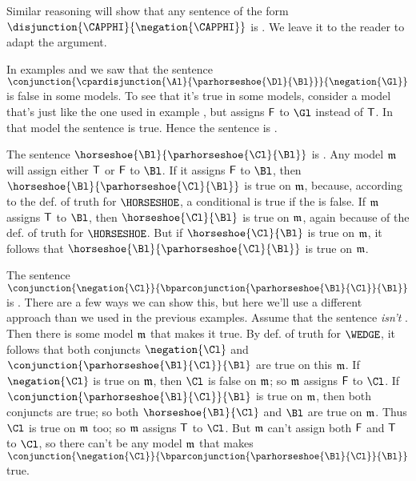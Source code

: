 \begin{majorILnc}{}
Similar reasoning will show that any sentence of the form $\disjunction{\CAPPHI}{\negation{\CAPPHI}}$ is .
We leave it to the reader to adapt the argument. 
\end{majorILnc}
\begin{majorILnc}{}
In examples  and  we saw that the sentence $\conjunction{\cpardisjunction{\Al}{\parhorseshoe{\Dl}{\Bl}}}{\negation{\Gl}}$ is false in some models.
To see that it's true in some models, consider a model that's just like the one used in example , but assigns $\mathsf{F}$ to $\Gl$ instead of $\mathsf{T}$. 
In that model the sentence is true. 
Hence the sentence is . 
\end{majorILnc}
\begin{majorILnc}{}
The sentence $\horseshoe{\Bl}{\parhorseshoe{\Cl}{\Bl}}$ is .
Any model $\mathfrak{m}$ will assign either $\mathsf{T}$ or $\mathsf{F}$ to $\Bl$. 
If it assigns $\mathsf{F}$ to $\Bl$, then $\horseshoe{\Bl}{\parhorseshoe{\Cl}{\Bl}}$ is true on $\mathfrak{m}$, because, according to the def. of truth for $\HORSESHOE$, a conditional is true if the  is false.
If $\mathfrak{m}$ assigns $\mathsf{T}$ to $\Bl$, then $\horseshoe{\Cl}{\Bl}$ is true on $\mathfrak{m}$, again because of the def. of truth for $\HORSESHOE$. 
But if $\horseshoe{\Cl}{\Bl}$ is true on $\mathfrak{m}$, it follows that $\horseshoe{\Bl}{\parhorseshoe{\Cl}{\Bl}}$ is true on $\mathfrak{m}$. 
\end{majorILnc}%
\begin{majorILnc}{}
The sentence $\conjunction{\negation{\Cl}}{\bparconjunction{\parhorseshoe{\Bl}{\Cl}}{\Bl}}$ is .
There are a few ways we can show this, but here we'll use a different approach than we used in the previous examples.
Assume that the sentence \emph{isn't} .
Then there is some model $\mathfrak{m}$ that makes it true.
By def. of truth for $\WEDGE$, it follows that both conjuncts $\negation{\Cl}$ and $\conjunction{\parhorseshoe{\Bl}{\Cl}}{\Bl}$ are true on this $\mathfrak{m}$.
If $\negation{\Cl}$ is true on $\mathfrak{m}$, then $\Cl$ is false on $\mathfrak{m}$; so $\mathfrak{m}$ assigns $\mathsf{F}$ to $\Cl$.
If $\conjunction{\parhorseshoe{\Bl}{\Cl}}{\Bl}$ is true on $\mathfrak{m}$, then both conjuncts are true; 
so both $\horseshoe{\Bl}{\Cl}$ and $\Bl$ are true on $\mathfrak{m}$.
Thus $\Cl$ is true on $\mathfrak{m}$ too; 
so $\mathfrak{m}$ assigns $\mathsf{T}$ to $\Cl$.
But $\mathfrak{m}$ can't assign both $\mathsf{F}$ and $\mathsf{T}$ to $\Cl$, so there can't be any model $\mathfrak{m}$ that makes $\conjunction{\negation{\Cl}}{\bparconjunction{\parhorseshoe{\Bl}{\Cl}}{\Bl}}$ true. 
\end{majorILnc}

